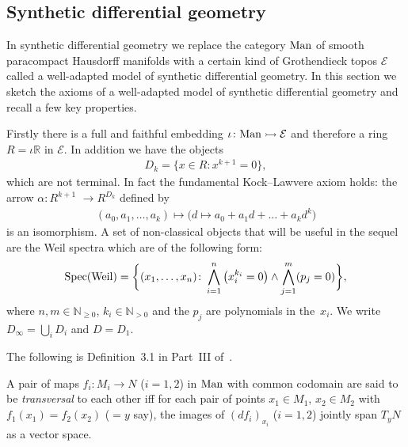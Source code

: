 \documentclass[10pt,a4paper]{amsart}
\numberwithin{equation}{section}
\begin{document}
\subsection{Synthetic dif\/ferential geometry}\label{sec:sdg}

In synthetic dif\/ferential geometry we replace the category ${\rm Man}$ of smooth paracompact Hausdorf\/f manifolds with a certain kind of Grothendieck topos $\mathcal{E}$ called a well-adapted model of synthetic dif\/ferential geometry. In this section we sketch the axioms of a well-adapted model of synthetic dif\/ferential geometry and recall a few key properties.

Firstly there is a full and faithful embedding $\iota\colon {\rm Man} \rightarrowtail \mathcal{E}$ and therefore a ring $R=\iota\mathbb{R}$ in $\mathcal{E}$.
In addition we have the objects
\begin{gather*}D_k=\big\{x\in R\colon x^{k+1}=0\big\},\end{gather*}
which are not terminal. In fact the fundamental Kock--Lawvere axiom holds: the arrow $\alpha\colon R^{k+1}$ $\rightarrow R^{D_k}$ def\/ined by
\begin{gather*}(a_0,a_1,\dots ,a_k)\mapsto\big(d\mapsto a_0+a_1d+\dots +a_kd^k\big)\end{gather*}
is an isomorphism. A set of non-classical objects that will be useful in the sequel are the Weil spectra which are of the following form:
\begin{gather*}{\rm Spec}({\rm Weil}) = \bigg\{(x_1,\dots ,x_n)\colon \bigwedge_{i=1}^n\big(x_i^{k_i}=0\big)\wedge\bigwedge_{j=1}^m(p_j=0)\bigg\},\end{gather*}
where $n,m\in\mathbb{N}_{\geq 0}$, $k_i\in \mathbb{N}_{>0}$ and the $p_j$ are polynomials in the~$x_i$. We write $D_{\infty}=\bigcup_i D_i$ and $D=D_1$.

The following is Def\/inition~3.1 in Part~III of~\cite{MR2244115}.

\begin{Definition}A pair of maps $f_i\colon M_i \rightarrow N$ ($i=1,2$) in ${\rm Man}$ with common codomain are said to be \emph{transversal} to each other if\/f for each pair of points $x_1\in M_1$, $x_2\in M_2$ with $f_1(x_1)=f_2(x_2)$ ($=y$ say), the images of $(df_i)_{x_i}$ ($i=1,2$) jointly span $T_y N$ as a vector space.
\end{Definition}
\end{document}
